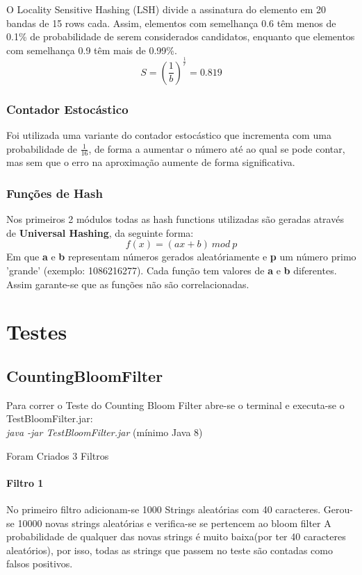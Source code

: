 \documentclass{report}
\begin{document}
O Locality Sensitive Hashing (LSH) divide a assinatura do elemento em 20 bandas de 15 rows cada.
Assim, elementos com semelhança 0.6 têm menos de 0.1\% de probabilidade de serem considerados candidatos, enquanto que elementos com semelhança 0.9 têm mais de 0.99\%.
\[ S = (\frac{1}{b})^{\frac{1}{r}} = 0.819\]
\subsection{Contador Estocástico}

Foi utilizada uma variante do contador estocástico que incrementa com uma probabilidade de \(\frac{1}{16}\), de forma a aumentar o número até ao qual se pode contar, mas sem que o erro na aproximação aumente de forma significativa.

\subsection{Funções de Hash}

Nos primeiros 2 módulos todas as hash functions utilizadas são geradas através de \textbf{Universal Hashing}, da seguinte forma:
\[ f(x) = (ax + b) \:mod\:  p \]
Em que \textbf{a} e \textbf{b} representam números gerados aleatóriamente e \textbf{p} um número primo 'grande' (exemplo: 1086216277). Cada função tem valores de \textbf{a} e \textbf{b} diferentes.
Assim garante-se que as funções não são correlacionadas.



\chapter{Testes}
\label{chap.Testes}
\section{CountingBloomFilter}
Para correr o Teste do Counting Bloom Filter abre-se o terminal e executa-se o TestBloomFilter.jar:
\\
\textit{ java -jar TestBloomFilter.jar} (mínimo Java 8)

Foram Criados 3 Filtros
\subsubsection{Filtro 1}
No primeiro filtro adicionam-se 1000 Strings aleatórias com 40 caracteres.
Gerou-se 10000 novas strings aleatórias e verifica-se se pertencem ao bloom filter
A probabilidade de qualquer das novas strings é muito baixa(por ter 40 caracteres aleatórios), por isso, todas as strings que passem no teste são contadas como falsos positivos.
\end{document}
